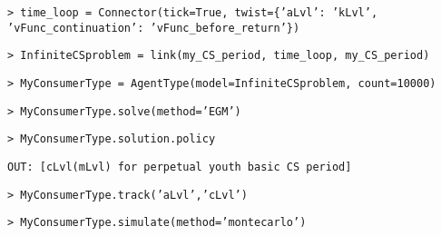 \documentclass[12pt,pdftex,letterpaper]{article}
\begin{document}
\texttt{> time\_loop = Connector(tick=True, twist=\{'aLvl': 'kLvl', 'vFunc\_continuation': 'vFunc\_before\_return'\})}

\texttt{> InfiniteCSproblem = link(my\_CS\_period, time\_loop, my\_CS\_period)}

\texttt{> MyConsumerType = AgentType(model=InfiniteCSproblem, count=10000)}

\texttt{> MyConsumerType.solve(method='EGM')}

\texttt{> MyConsumerType.solution.policy}

\texttt{OUT: [cLvl(mLvl) for perpetual youth basic CS period]}

\texttt{> MyConsumerType.track('aLvl','cLvl')}

\texttt{> MyConsumerType.simulate(method='montecarlo')}
\end{document}
